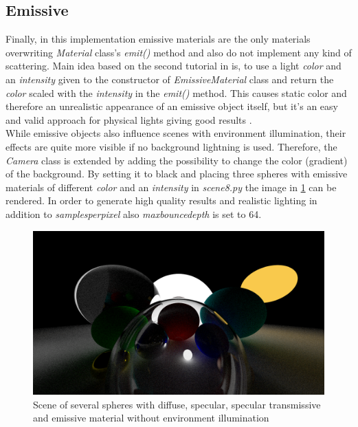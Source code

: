\documentclass[]{article}
\begin{document}
		\subsection{Emissive}
		Finally, in this implementation emissive materials are the only materials overwriting \emph{Material} class's \emph{emit()} method and also do not implement any kind of scattering. Main idea based on the second tutorial in \cite{Shirley2020RTW2} is, to use a light \emph{color} and an \emph{intensity} given to the constructor of \emph{EmissiveMaterial} class and return the \emph{color} scaled with the \emph{intensity} in the \emph{emit()} method. This causes static color and therefore an unrealistic appearance of an emissive object itself, but it's an easy and valid approach for physical lights giving good results .
		\\
		While emissive objects also influence scenes with environment illumination, their effects are quite more visible if no background lightning is used. Therefore, the \emph{Camera} class is extended by adding the possibility to change the color (gradient) of the background. By setting it to black and placing three spheres with emissive materials of different \emph{color} and an \emph{intensity} in \emph{scene8.py} the image in \cref{fig:image8} can be rendered. In order to generate high quality results and realistic lighting in addition to \emph{samples\textunderscore per\textunderscore pixel} also \emph{max\textunderscore bounce\textunderscore depth} is set to 64.
		
		\begin{figure}[h]
			\centering
			\includegraphics[width=0.9\linewidth]{image8}
			\caption{Scene of several spheres with diffuse, specular, specular transmissive and emissive material without environment illumination}
			\label{fig:image8}
		\end{figure}
		
\end{document}
